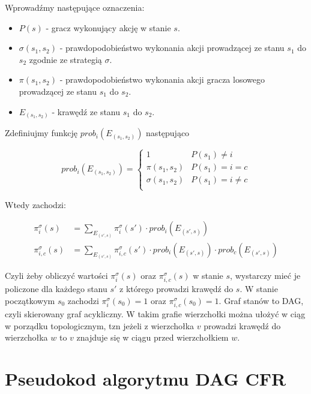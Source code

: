 \documentclass[licencjacka]{pracamgr}
\begin{document}
\noindent
Wprowadźmy następujące oznaczenia:

\begin{itemize}
\item $P(s)$ - gracz wykonujący akcję w stanie $s$.
\item $\sigma(s_1, s_2)$ - prawdopodobieństwo wykonania akcji prowadzącej ze stanu $s_1$ do $s_2$ zgodnie ze strategią $\sigma$.
\item $\pi(s_1, s_2)$ - prawdopodobieństwo wykonania akcji gracza losowego prowadzącej ze stanu $s_1$ do $s_2$.
\item $E_{(s_1, s_2)}$ - krawędź ze stanu $s_1$ do $s_2$.
\end{itemize}

\noindent
Zdefiniujmy funkcję $prob_i(E_{(s_1, s_2)})$ następująco 

\begin{equation*}
prob_i(E_{(s_1, s_2)}) = \begin{cases}
                            1                & P(s_1) \neq i     \\
                            \pi(s_1, s_2)    & P(s_1) = i = c    \\
                            \sigma(s_1, s_2) & P(s_1) = i \neq c \\
                          \end{cases}
\end{equation*}

\noindent
Wtedy zachodzi:

\begin{align*}
\pi_i^{\sigma}(s) &= \sum\limits_{E_{(s', s)}} \pi_i^{\sigma}(s') \cdot prob_i(E_{(s', s)}) \\
\pi_{i, c}^{\sigma}(s) &= \sum\limits_{E_{(s', s)}} \pi_{i, c}^{\sigma}(s') \cdot prob_i(E_{(s', s)}) \cdot prob_c(E_{(s', s)})
\end{align*}

\noindent
Czyli żeby obliczyć wartości $\pi_i^{\sigma}(s)$ oraz $\pi_{i, c}^{\sigma}(s)$ w stanie $s$, wystarczy
mieć je policzone dla każdego stanu $s'$ z którego prowadzi krawędź do $s$. W stanie początkowym $s_0$ zachodzi
$\pi_i^{\sigma}(s_0) = 1$ oraz $\pi_{i, c}^{\sigma}(s_0) = 1$. Graf stanów to DAG, czyli
skierowany graf acykliczny. W takim grafie wierzchołki można ułożyć w ciąg w porządku topologicznym, tzn
jeżeli z wierzchołka $v$ prowadzi krawędź do wierzchołka $w$ to $v$ znajduje się w ciągu przed wierzchołkiem $w$.

\section{Pseudokod algorytmu DAG CFR}
\end{document}
